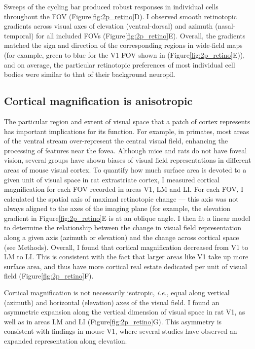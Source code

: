 Sweeps of the cycling bar produced robust responses in individual cells throughout the FOV (Figure\ref{fig:2p_retino}D). I observed smooth retinotopic gradients across visual axes of elevation (ventral-dorsal) and azimuth (nasal-temporal) for all included FOVs (Figure\ref{fig:2p_retino}E). Overall, the gradients matched the sign and direction of the corresponding regions in wide-field maps (for example, green to blue for the V1 FOV shown in (Figure\ref{fig:2p_retino}E)), and on average, the particular retinotopic preferences of most individual cell bodies were similar to that of their background neuropil.

\subsection{Cortical magnification is anisotropic}
The particular region and extent of visual space that a patch of cortex represents has important implications for its function. For example, in primates, most areas of the ventral stream over-represent the central visual field, enhancing the processing of features near the fovea\cite{Gattass2005CorticalDynamics}. Although mice and rats do not have foveal vision, several groups have shown biases of visual field representations in different areas of mouse visual cortex\cite{Garrett2014, Marshel2011, Sit2020}. To quantify how much surface area is devoted to a given unit of visual space in rat extrastriate cortex, I measured cortical magnification for each FOV recorded in areas V1, LM and LI. For each FOV, I calculated the spatial axis of maximal retinotopic change --- this axis was not always aligned to the axes of the imaging plane (for example, the elevation gradient in  Figure\ref{fig:2p_retino}E is at an oblique angle. I then fit a linear model to determine the relationship between the change in visual field representation along a given axis (azimuth or elevation) and the change across cortical space (see Methods). Overall, I found that cortical magnification decreased from V1 to LM to LI. This is consistent with the fact that larger areas like V1 take up more surface area, and thus have more cortical real estate dedicated per unit of visual field (Figure\ref{fig:2p_retino}F). 

Cortical magnification is not necessarily isotropic, \textit{i.e.}, equal along vertical (azimuth) and horizontal (elevation) axes of the visual field. I found an asymmetric expansion along the vertical dimension of visual space in rat V1, as well as in areas LM and LI (Figure\ref{fig:2p_retino}G). This asymmetry is consistent with findings in mouse V1, where several studies have observed an expanded representation along elevation\cite{Garrett2014, Liang2018, Bonin2011}.  

